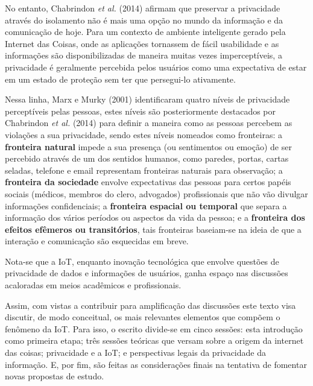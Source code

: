 No entanto, Chabrindon \textit{et al.} (2014) afirmam que preservar a privacidade através do isolamento não é mais uma opção no mundo da informação e da comunicação de hoje. Para um contexto de ambiente inteligente gerado pela Internet das Coisas, onde as aplicações tornassem de fácil usabilidade e as informações são disponibilizadas de maneira muitas vezes imperceptíveis, a privacidade é geralmente percebida pelos usuários como uma expectativa de estar em um estado de proteção sem ter que persegui-lo ativamente.

Nessa linha, Marx e Murky (2001) identificaram quatro níveis de privacidade perceptíveis pelas pessoas, estes níveis são posteriormente destacados por Chabrindon \textit{et al.} (2014) para definir a maneira como as pessoas percebem as violações a sua privacidade, sendo estes níveis nomeados como fronteiras: a \textbf{fronteira natural} impede a sua presença (ou sentimentos ou emoção) de ser percebido através de um dos sentidos humanos, como paredes, portas, cartas seladas, telefone e email representam fronteiras naturais para observação; a \textbf{fronteira da sociedade} envolve expectativas das pessoas para certos papéis sociais (médicos, membros do clero, advogados) profissionais que não vão divulgar informações confidenciais; a \textbf{fronteira espacial ou temporal} que separa a informação dos vários períodos ou aspectos da vida da pessoa; e a \textbf{fronteira dos efeitos efêmeros ou transitórios}, tais fronteiras baseiam-se na ideia de que a interação e comunicação são esquecidas em breve.

Nota-se que a IoT, enquanto inovação tecnológica que envolve questões de privacidade de dados e informações de usuários, ganha espaço nas discussões acaloradas em meios acadêmicos e profissionais.

Assim, com vistas a contribuir para amplificação das discussões este texto visa discutir, de modo conceitual, os mais relevantes elementos que compõem o fenômeno da IoT. Para isso, o escrito divide-se em cinco sessões: esta introdução como primeira etapa; três sessões teóricas que versam sobre a origem da internet das coisas; privacidade e a IoT; e perspectivas legais da privacidade da informação. E, por fim, são feitas as considerações finais na tentativa de fomentar novas propostas de estudo.